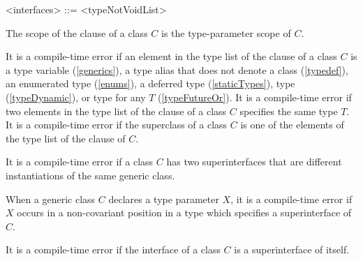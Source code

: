 \documentclass[makeidx]{article}
\begin{document}
\begin{grammar}
<interfaces> ::= \IMPLEMENTS{} <typeNotVoidList>
\end{grammar}

\LMHash{}%
The scope of the \IMPLEMENTS{} clause of a class $C$ is
the type-parameter scope of $C$.

\LMHash{}%
It is a compile-time error if an element
in the type list of the \IMPLEMENTS{} clause of a class $C$ is
a type variable (\ref{generics}),
a type alias that does not denote a class (\ref{typedef}),
an enumerated type (\ref{enums}),
a deferred type (\ref{staticTypes}), type \DYNAMIC{} (\ref{typeDynamic}),
or type  for any $T$ (\ref{typeFutureOr}).
It is a compile-time error if two elements in the type list of
the \IMPLEMENTS{} clause of a class $C$ specifies the same type $T$.
It is a compile-time error if the superclass of a class $C$ is
one of the elements of the type list of the \IMPLEMENTS{} clause of $C$.


\LMHash{}%
It is a compile-time error if a class $C$ has two superinterfaces
that are different instantiations of the same generic class.

\LMHash{}%
When a generic class $C$ declares a type parameter $X$,
it is a compile-time error if $X$ occurs in a non-covariant position
in a type which specifies a superinterface of $C$.

\LMHash{}%
It is a compile-time error if the interface of a class $C$ is
a superinterface of itself.

\end{document}
